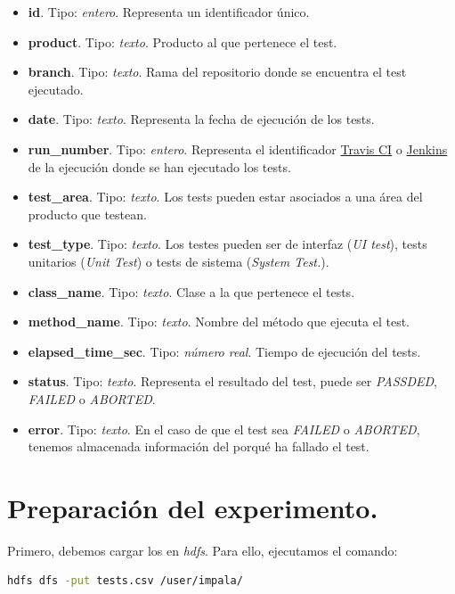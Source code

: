 \documentclass[10pt]{article}
\begin{document}
\begin{itemize}
	\item \textbf{id}. Tipo: \textit{entero}. Representa un identificador único.
	\item \textbf{product}. Tipo: \textit{texto}. Producto al que pertenece el test.
	\item \textbf{branch}. Tipo: \textit{texto}. Rama del repositorio donde se encuentra el test ejecutado.
	\item \textbf{date}. Tipo: \textit{texto}. Representa la fecha de ejecución de los tests.
	\item \textbf{run\_number}. Tipo: \textit{entero}. Representa el identificador \href{https://travis-ci.org/}{Travis CI} o \href{https://jenkins.io/}{Jenkins} de la ejecución donde se han ejecutado los tests.
	\item \textbf{test\_area}. Tipo: \textit{texto}. Los tests pueden estar asociados a una área del producto que testean.
	\item \textbf{test\_type}. Tipo: \textit{texto}. Los testes pueden ser de interfaz (\textit{UI test}), tests unitarios (\textit{Unit Test}) o tests de sistema (\textit{System Test.}).
	\item \textbf{class\_name}. Tipo: \textit{texto}. Clase a la que pertenece el tests.
	\item \textbf{method\_name}. Tipo: \textit{texto}. Nombre del método que ejecuta el test.
	\item \textbf{elapsed\_time\_sec}. Tipo: \textit{número real}. Tiempo de ejecución del tests.
	\item \textbf{status}. Tipo: \textit{texto}. Representa el resultado del test, puede ser \textit{PASSDED}, \textit{FAILED} o \textit{ABORTED}.
	\item \textbf{error}. Tipo: \textit{texto}. En el caso de que el test sea \textit{FAILED} o \textit{ABORTED}, tenemos almacenada información del porqué ha fallado el test.
\end{itemize}

\section{Preparación del experimento.}

Primero, debemos cargar los en \textit{hdfs}. Para ello, ejecutamos el comando:

\begin{lstlisting}[frame=single, language=bash, xleftmargin=.25in, basicstyle=\small, upquote=true, breaklines = true]
hdfs dfs -put tests.csv /user/impala/
\end{lstlisting}
\end{document}
